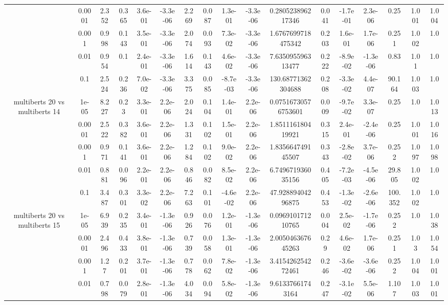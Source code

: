 \begin{tabular}{|c|c|c|c|c|c|c|c|c|c|c|c|c|c|c|c|c|}
 & 0.0001 & 2.352 & 0.365 & 3.6e-01 & -3.3e-06 & 2.269 & 0.087 & 1.3e-01 & -3.3e-06 & 0.280523896217346 & 0.041 & -1.7e-01 & 2.3e-06 & 0.25 & 1.001 & 1.004 \\
 & 0.001 & 0.998 & 0.143 & 3.5e-01 & -3.3e-06 & 2.074 & 0.093 & 7.3e-02 & -3.3e-06 & 1.6767699718475342 & 0.203 & 1.6e-01 & 1.7e-06 & 0.251 & 1.002 & 1.0 \\
 & 0.01 & 0.954 & 0.1 & 2.4e-01 & -3.3e-06 & 1.614 & 0.143 & 4.6e-02 & -3.3e-06 & 7.635095596313477 & 0.222 & -8.9e-02 & -1.3e-06 & 0.83 & 1.01 & 1.0 \\
 & 0.1 & 2.524 & 0.236 & 7.0e-02 & -3.3e-06 & 3.375 & 0.085 & -8.7e-03 & -3.3e-06 & 130.68771362304688 & 0.208 & -3.3e-02 & 4.4e-07 & 90.164 & 1.003 & 1.0 \\
\hline
\multirow{5}{*}{multiberts 20 vs multiberts 14} & 1e-05 & 8.227 & 0.23 & 3.3e-01 & 2.2e-06 & 2.024 & 0.104 & 1.4e-01 & 2.2e-06 & 0.07516730576753601 & 0.009 & -9.7e-02 & 3.3e-07 & 0.25 & 1.0 & 1.013 \\
 & 0.0001 & 2.522 & 0.382 & 3.6e-01 & 2.2e-06 & 1.331 & 0.102 & 1.5e-01 & 2.2e-06 & 1.851116180419921 & 0.315 & 2.4e-01 & -2.4e-06 & 0.25 & 1.001 & 1.016 \\
 & 0.001 & 0.971 & 0.141 & 3.6e-01 & 2.2e-06 & 1.284 & 0.102 & 9.0e-02 & 2.2e-06 & 1.835664749145507 & 0.343 & -2.8e-02 & 3.7e-06 & 0.252 & 1.097 & 1.098 \\
 & 0.01 & 0.881 & 0.096 & 2.2e-01 & 2.2e-06 & 0.846 & 0.082 & 8.5e-02 & 2.2e-06 & 6.749671936035156 & 0.405 & -7.2e-03 & -4.5e-06 & 29.805 & 1.002 & 1.0 \\
 & 0.1 & 3.487 & 0.301 & 3.3e-02 & 2.2e-06 & 7.263 & 0.101 & -4.6e-02 & 2.2e-06 & 47.92889404296875 & 0.453 & -1.3e-02 & -2.6e-06 & 100.352 & 1.002 & 1.0 \\
\hline
\multirow{5}{*}{multiberts 20 vs multiberts 15} & 1e-05 & 6.939 & 0.235 & 3.4e-01 & -1.3e-06 & 0.926 & 0.076 & 1.2e-01 & -1.3e-06 & 0.096910171210765 & 0.004 & 2.5e-02 & -1.7e-06 & 0.252 & 1.0 & 1.038 \\
 & 0.0001 & 2.496 & 0.433 & 3.8e-01 & -1.3e-06 & 0.739 & 0.058 & 1.3e-01 & -1.3e-06 & 2.005046367645263 & 0.29 & 4.6e-02 & 1.7e-06 & 0.251 & 1.03 & 1.054 \\
 & 0.001 & 1.27 & 0.201 & 3.7e-01 & -1.3e-06 & 0.778 & 0.062 & 7.8e-02 & -1.3e-06 & 3.415426254272461 & 0.246 & -3.6e-02 & -3.6e-06 & 0.252 & 1.004 & 1.001 \\
 & 0.01 & 0.798 & 0.079 & 2.8e-01 & -1.3e-06 & 4.034 & 0.094 & 5.8e-02 & -1.3e-06 & 9.61337661743164 & 0.247 & -3.1e-02 & 5.5e-06 & 1.107 & 1.003 & 1.001 \\

\end{tabular}
